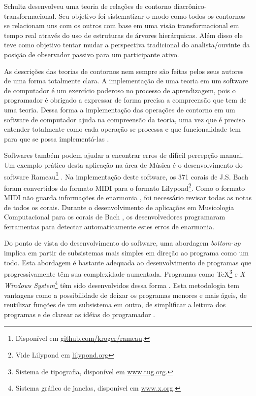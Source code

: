 \documentclass[12pt]{article}
\newcommand{\eng}[1]{\textit{#1}}
\begin{document}

Schultz \cite{schultz09:diachronic} desenvolveu uma teoria de relações
de contorno diacrônico-transformacional. Seu objetivo foi sistematizar
o modo como todos os contornos se relacionam uns com os outros com
base em uma visão transformacional em tempo real através do uso de
estruturas de árvores hierárquicas. Além disso ele teve como objetivo
tentar mudar a perspectiva tradicional do analista/ouvinte da posição
de observador passivo para um participante ativo.

As descrições das teorias de contornos nem sempre são feitas pelos
seus autores de uma forma totalmente clara. A implementação de uma
teoria em um software de computador é um exercício poderoso no
processo de aprendizagem, pois o programador é obrigado a expressar de
forma precisa a compreensão que tem de uma teoria. Dessa forma a
implementação das operações de contorno em um software de computador
ajuda na compreensão da teoria, uma vez que é preciso entender
totalmente como cada operação se processa e que funcionalidade tem
para que se possa implementá-las \cite{sampaio08:em}.

Softwares também podem ajudar a encontrar erros de difícil percepção
manual. Um exemplo prático desta aplicação na área de Música é o
desenvolvimento do software Rameau\footnote{Disponível em
  \url{github.com/kroger/rameau}.}
\cite{kroger08:rameau,passos.ea09:functional}. Na implementação deste
software, os 371 corais de J.S. Bach foram convertidos do formato MIDI
para o formato Lilypond\footnote{Vide Lilypond em
  \url{lilypond.org}}. Como o formato MIDI não guarda informações de
enarmonia \cite{selfridge-field97:beyond}, foi necessário revisar
todas as notas de todos os corais. Durante o desenvolvimento de
aplicações em Musicologia Computacional para os corais de Bach
\cite{kroger08:musicologia}, os desenvolvedores programaram
ferramentas para detectar automaticamente estes erros de enarmonia.

Do ponto de vista do desenvolvimento do software, uma abordagem
\eng{bottom-up} implica em partir de subsistemas mais simples em
direção ao programa como um todo. Esta abordagem é bastante adequada
ao desenvolvimento de programas que progressivamente têm sua
complexidade aumentada. Programas como \TeX{}\footnote{Sistema de
  tipografia, disponível em \url{www.tug.org}.} e \eng{X Windows
  System}\footnote{Sistema gráfico de janelas, disponível em
  \url{www.x.org}.} têm sido desenvolvidos dessa forma
\cite[p. vi]{graham94:lisp}. Esta metodologia tem vantagens como a
possibilidade de deixar os programas menores e mais ágeis, de
reutilizar funções de um subsistema em outro, de simplificar a leitura
dos programas e de clarear as idéias do programador
\cite[p. 4]{graham94:lisp}.
\end{document}
